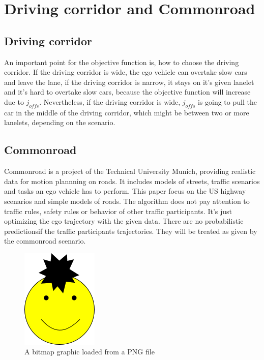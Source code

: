 \documentclass[conference]{IEEEtran}
\begin{document}
\section{Driving corridor and Commonroad}
\subsection{Driving corridor}
An important point for the objective function is, how to choose the driving corridor. If the driving corridor is wide, the ego vehicle can overtake slow cars and leave the lane, if the driving corridor is narrow, it stays on it's given lanelet and it's hard to overtake slow cars, because the objective function will increase due to $j_{offs}$. Nevertheless, if the driving corridor is wide, $j_{offs} $  is going to pull the car in the middle of the driving corridor, which might be between two or more lanelets, depending on the scenario.

\subsection{Commonroad}
Commonroad is a project of the Technical University Munich, providing realistic data for motion plannning on roads. It includes models of streets, traffic scenarios and tasks an ego vehicle has to perform. This paper focus on the US highway scenarios and simple models of roads. The algorithm does not pay attention to traffic rules, safety rules or behavior of other traffic participants. It's just optimizing the ego trajectory with the given data. There are no probabilistic predictionsif the traffic participants trajectories. They will be treated as given by the commonroad scenario.

\begin{figure}[h]
\begin{center}
\includegraphics{./images/grins.png}
\end{center}
\caption{A bitmap graphic loaded from a PNG file}
\label{Pic2}
\end{figure}
\end{document}
